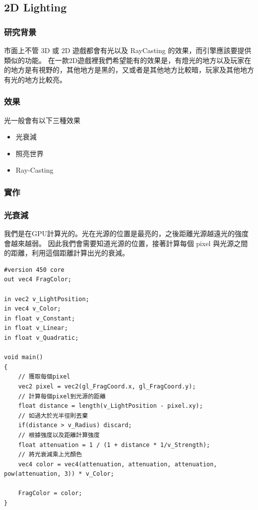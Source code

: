 \subsection{2D Lighting}
\label{sub:2D Lighting}
\subsubsection{研究背景}

市面上不管 3D 或 2D 遊戲都會有光以及 RayCasting 的效果，而引擎應該要提供類似的功能。
在一款2D遊戲裡我們希望能有的效果是，有燈光的地方以及玩家在的地方是有視野的，其他地方是黑的，又或者是其他地方比較暗，玩家及其他地方有光的地方比較亮。

\subsubsection{效果}

光一般會有以下三種效果

\begin{itemize}
\item{光衰減}
\item{照亮世界}
\item{Ray-Casting}
\end{itemize}

\subsubsection{實作}

\subsubsection{光衰減}
我們是在GPU計算光的。光在光源的位置是最亮的，之後距離光源越遠光的強度會越來越弱。
因此我們會需要知道光源的位置，接著計算每個 pixel 與光源之間的距離，利用這個距離計算出光的衰減。

\begin{lstlisting}
#version 450 core
out vec4 FragColor;

in vec2 v_LightPosition;
in vec4 v_Color;
in float v_Constant;
in float v_Linear;
in float v_Quadratic;

void main()
{
    // 獲取每個pixel
    vec2 pixel = vec2(gl_FragCoord.x, gl_FragCoord.y);
    // 計算每個pixel到光源的距離
    float distance = length(v_LightPosition - pixel.xy);
    // 如過大於光半徑則丟棄
    if(distance > v_Radius) discard;
    // 根據強度以及距離計算強度
    float attenuation = 1 / (1 + distance * 1/v_Strength);
    // 將光衰減乘上光顏色
    vec4 color = vec4(attenuation, attenuation, attenuation, pow(attenuation, 3)) * v_Color;

    FragColor = color;
}
\end{lstlisting}


